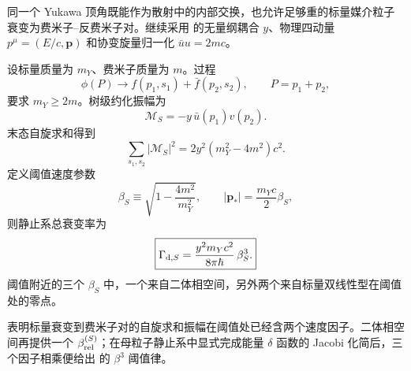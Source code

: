 
同一个 Yukawa 顶角既能作为散射中的内部交换，也允许足够重的标量媒介粒子衰变为费米子--反费米子对。继续采用 的无量纲耦合 $y$、物理四动量 $p^\mu=(E/c,\mathbf p)$ 和协变旋量归一化 $\bar uu=2mc$。

\begin{exbox}[标量 Yukawa 衰变]
设标量质量为 $m_Y$、费米子质量为 $m$。过程
\begin{equation*}
 \phi(P)\to f(p_1,s_1)+\bar f(p_2,s_2),
 \qquad P=p_1+p_2,
\end{equation*}
要求 $m_Y\ge2m$。树级约化振幅为
\begin{equation}
 \boxed{\mathcal M_S=-y\,\bar u(p_1)v(p_2).}
 \label{eq:yukawa-scalar-decay-M-si-r10}
\end{equation}
末态自旋求和得到
\begin{equation}
 \boxed{
 \sum_{s_1,s_2}|\mathcal M_S|^2
 =2y^2(m_Y^2-4m^2)c^2.}
 \label{eq:yukawa-scalar-decay-M2-si-r10}
\end{equation}
定义阈值速度参数
\begin{equation}
 \beta_S\equiv\sqrt{1-\frac{4m^2}{m_Y^2}},
 \qquad
 |\mathbf p_*|=\frac{m_Yc}{2}\beta_S,
 \label{eq:yukawa-decay-beta-si-r10}
\end{equation}
则静止系总衰变率为
\begin{equation}
 \boxed{
 \Gamma_{{\rm d},S}
 =\frac{y^2m_Y c^2}{8\pi\hbar}\,\beta_S^3.}
 \label{eq:yukawa-scalar-decay-width-si-r10}
\end{equation}
阈值附近的三个 $\beta_S$ 中，一个来自二体相空间，另外两个来自标量双线性型在阈值处的零点。


\medskip

 表明标量衰变到费米子对的自旋求和振幅在阈值处已经含两个速度因子。二体相空间再提供一个 $\beta_{\rm rel}^{(S)}$；在母粒子静止系中显式完成能量 $\delta$ 函数的 Jacobi 化简后，三个因子相乘便给出 的 $\beta^3$ 阈值律。


\end{exbox}
